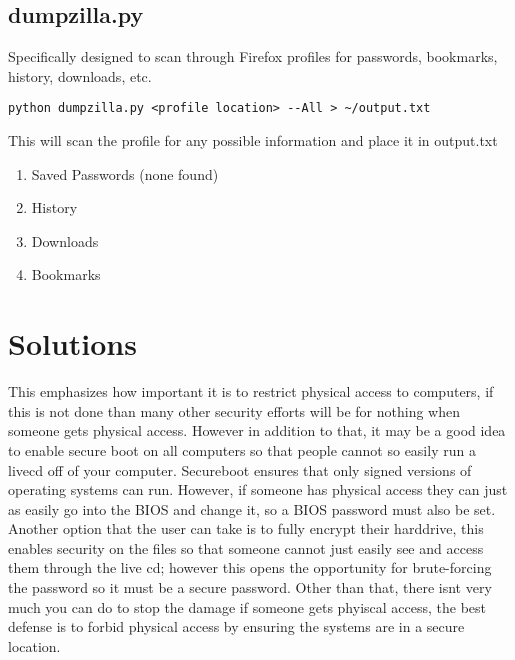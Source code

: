 \documentclass[a4paper, 11pt]{article}
\begin{document}
\subsection*{dumpzilla.py}
Specifically designed to scan through Firefox profiles for passwords, bookmarks, history, downloads, etc.
\begin{lstlisting}
python dumpzilla.py <profile location> --All > ~/output.txt
\end{lstlisting}
This will scan the profile for any possible information and place it in output.txt
\begin{enumerate}
\item Saved Passwords (none found)
\item History
\item Downloads
\item Bookmarks
\end{enumerate}

\section*{Solutions}
This emphasizes how important it is to restrict physical access to computers, if this is not done than many other security efforts will be for nothing when someone gets physical access.  However in addition to that, it may be a good idea to enable secure boot on all computers so that people cannot so easily run a livecd off of your computer.  Secureboot ensures that only signed versions of operating systems can run.  However, if someone has physical access they can just as easily go into the BIOS and change it, so a BIOS password must also be set.  Another option that the user can take is to fully encrypt their harddrive, this enables security on the files so that someone cannot just easily see and access them through the live cd; however this opens the opportunity for brute-forcing the password so it must be a secure password.  Other than that, there isnt very much you can do to stop the damage if someone gets phyiscal access, the best defense is to forbid physical access by ensuring the systems are in a secure location.
\end{document}
